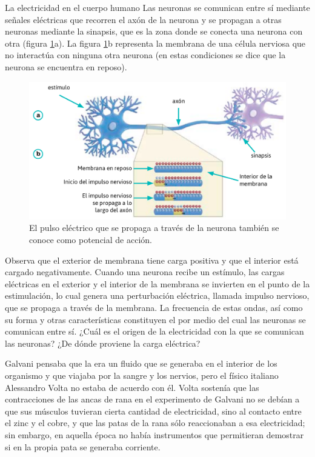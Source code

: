 \begin{sectionbox}{La electricidad en el cuerpo humano}
    Las neuronas se comunican entre sí mediante señales eléctricas que recorren el axón
    de la neurona y se propagan a otras neuronas mediante la sinapsis, que es la zona
    donde se conecta una neurona con otra (figura \ref{fig:20230502024056}a).
    La figura \ref{fig:20230502024056}b representa la membrana de una célula nerviosa que no interactúa
    con ninguna otra neurona (en estas condiciones se dice que la neurona se encuentra
    en reposo).
    \begin{figure}[H]
        \centering
        \includegraphics[width=0.8\linewidth]{../images/20230502024056}
        \caption{El pulso eléctrico que se propaga a través de la neurona también se conoce como potencial de acción.}
        \label{fig:20230502024056}
    \end{figure}

    \begin{minipage}{0.55\textwidth}
        Observa que el exterior de membrana tiene carga positiva y que el interior
        está cargado negativamente. Cuando una neurona recibe un estímulo, las cargas eléctricas en el exterior y el interior de la membrana se invierten en el punto de la estimulación, lo cual genera una perturbación eléctrica, llamada impulso nervioso, que
        se propaga a través de la membrana. La frecuencia de estas ondas, así como su forma
        y otras características constituyen el  por medio del cual las neuronas se
        comunican entre sí. ¿Cuál es el origen de la electricidad con la que se comunican las neuronas? ¿De
        dónde proviene la carga eléctrica?

        Galvani pensaba que la  era
        un fluido que se generaba en el interior de los organismo y que viajaba por la sangre
        y los nervios, pero el físico italiano Alessandro Volta no estaba de acuerdo con él.
        Volta sostenía que las contracciones de las ancas de rana en el experimento de Galvani
        no se debían a que sus músculos tuvieran cierta cantidad de electricidad, sino al contacto entre el zinc y el cobre, y que las patas de la rana sólo reaccionaban a esa electricidad; sin embargo, en aquella época no había instrumentos que permitieran demostrar
        si en la propia pata se generaba corriente.


\end{minipage}
\end{sectionbox}
